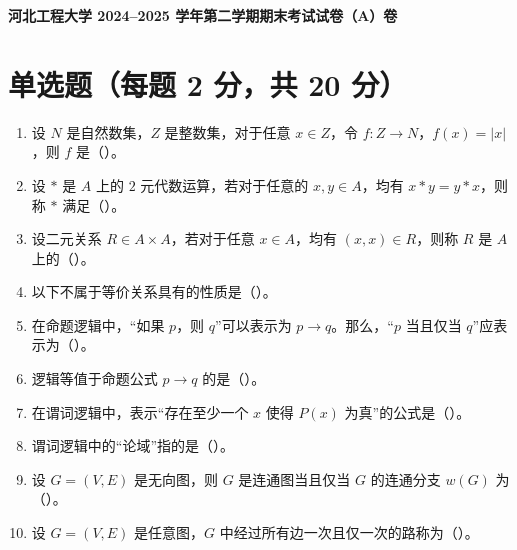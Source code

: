 
\begin{center}
    \textbf{\Large 河北工程大学 2024--2025 学年第二学期期末考试试卷（A）卷}
\end{center}

\setcounter{section}{0}

\section{单选题（每题 2 分，共 20 分）}

\begin{enumerate}
    \item 设 $N$ 是自然数集，$Z$ 是整数集，对于任意 $x\in Z$，令 $f: Z\to N$，$f(x)=|x|$，则 $f$ 是（\quad）。

    \item 设 $*$ 是 $A$ 上的 $2$ 元代数运算，若对于任意的 $x,y\in A$，均有 $x*y=y*x$，则称 $*$ 满足（\quad）。

    \item 设二元关系 $R\in A\times A$，若对于任意 $x\in A$，均有 $(x,x)\in R$，则称 $R$ 是 $A$ 上的（\quad）。

    \item 以下不属于等价关系具有的性质是（\quad）。

    \item 在命题逻辑中，“如果 $p$，则 $q$”可以表示为 $p\to q$。那么，“$p$ 当且仅当 $q$”应表示为（\quad）。

    \item 逻辑等值于命题公式 $p\to q$ 的是（\quad）。

    \item 在谓词逻辑中，表示“存在至少一个 $x$ 使得 $P(x)$ 为真”的公式是（\quad）。

    \item 谓词逻辑中的“论域”指的是（\quad）。

    \item 设 $G=(V,E)$ 是无向图，则 $G$ 是连通图当且仅当 $G$ 的连通分支 $w(G)$ 为（\quad）。

    \item 设 $G=(V,E)$ 是任意图，$G$ 中经过所有边一次且仅一次的路称为（\quad）。
\end{enumerate}

